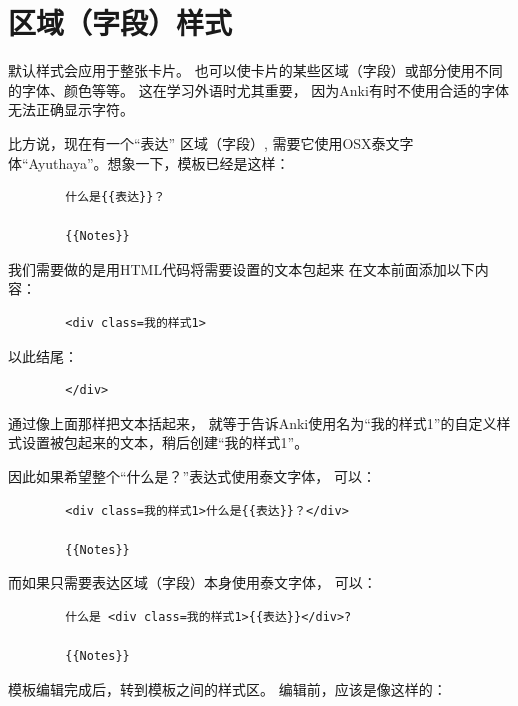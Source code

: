 \documentclass[a4paper]{book}
\begin{document}
	\section{区域（字段）样式}
	默认样式会应用于整张卡片。 也可以使卡片的某些区域（字段）或部分使用不同的字体、颜色等等。 这在学习外语时尤其重要， 因为Anki有时不使用合适的字体无法正确显示字符。
	
	比方说，现在有一个“表达” 区域（字段）, 需要它使用OSX泰文字体“Ayuthaya”。想象一下，模板已经是这样：
	
	\begin{shaded}\begin{verbatim}
		什么是{{表达}}？
		
		{{Notes}}
		\end{verbatim}\end{shaded}
	
	我们需要做的是用HTML代码将需要设置的文本包起来 在文本前面添加以下内容：
	
	\begin{shaded}\begin{verbatim}
		<div class=我的样式1>
		\end{verbatim}\end{shaded}
	
	以此结尾：
	
	\begin{shaded}\begin{verbatim}
		</div>
		\end{verbatim}\end{shaded}
	
	通过像上面那样把文本括起来， 就等于告诉Anki使用名为“我的样式1”的自定义样式设置被包起来的文本，稍后创建“我的样式1”。
	
	因此如果希望整个“什么是？”表达式使用泰文字体， 可以：
	
	\begin{shaded}\begin{verbatim}
		<div class=我的样式1>什么是{{表达}}？</div>
		
		{{Notes}}
		\end{verbatim}\end{shaded}
	而如果只需要表达区域（字段）本身使用泰文字体， 可以：
	
	\begin{shaded}\begin{verbatim}
		什么是 <div class=我的样式1>{{表达}}</div>?
		
		{{Notes}}
		\end{verbatim}\end{shaded}
	模板编辑完成后，转到模板之间的样式区。 编辑前，应该是像这样的：
	
\end{document}
